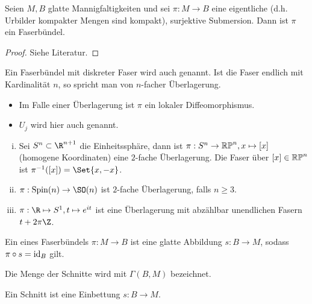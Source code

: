 \begin{st} \label{5.2}
    Seien $M, B$ glatte Mannigfaltigkeiten und sei $\pi: M \to B$ eine eigentliche (d.h. Urbilder kompakter Mengen sind kompakt), surjektive Submersion.
    Dann ist $\pi$ ein Faserbündel.
    \begin{proof}
        Siehe Literatur.
    \end{proof}
\end{st}

\begin{df} \label{5.3}
    Ein Faserbündel mit diskreter Faser wird auch  genannt. 
    Ist die Faser endlich mit Kardinalität $n$, so spricht man von $n$-facher Überlagerung.
    \begin{note}
        \begin{itemize}
            \item
                Im Falle einer Überlagerung ist $\pi$ ein lokaler Diffeomorphismus.
            \item
                $U_j$ wird hier auch  genannt.
        \end{itemize}
    \end{note}
\end{df}

\begin{ex*}
    \begin{enumerate}[(i)]
        \item
            Sei $S^n \subset \R^{n+1}$ die Einheitssphäre, dann ist $\pi: S^n \to \mathbb{RP}^n, x \mapsto [x]$ (homogene Koordinaten) eine $2$-fache Überlagerung.
            Die Faser über $[x] \in \mathbb{RP}^n$ ist $\pi^{-1}([x]) = \Set{x, -x}$.
        \item
            $\pi: \operatorname{Spin}(n) \to \SO(n)$ ist $2$-fache Überlagerung, falls $n \ge 3$.
        \item
            $\pi: \R \mapsto S^1, t \mapsto e^{it}$ ist eine Überlagerung mit abzählbar unendlichen Fasern $t + 2\pi\Z$.
    \end{enumerate}
\end{ex*}

\begin{df} \label{5.4}
    Ein  eines Faserbündels $\pi: M \to B$ ist eine glatte Abbildung $s: B \to M$, sodass $\pi \circ s = \operatorname{id}_B$ gilt.

    Die Menge der Schnitte wird mit $\Gamma(B, M)$ bezeichnet.
    \begin{note}
        Ein Schnitt ist eine Einbettung $s: B \to M$.
    \end{note}
\end{df}

